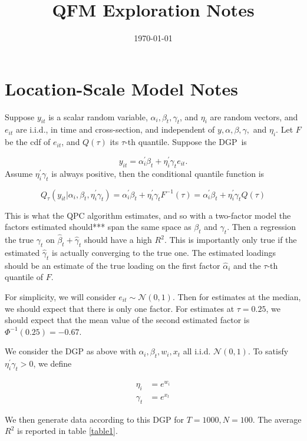 \documentclass{article}
\title{QFM Exploration Notes}
\author{}
\date{\today}
\begin{document}
\maketitle

\section{Location-Scale Model Notes}

Suppose $y_{it}$ is a scalar random variable, $\alpha_{i}, \beta_t, \gamma_t$, and $\eta_i$ are random vectors, and $e_{it}$ are i.i.d., in time and cross-section, and independent of $y, \alpha, \beta, \gamma,$ and $\eta_i$. Let $F$ be the cdf of $e_{it}$, and $Q(\tau )$ its $\tau $-th quantile. Suppose the DGP\ is

%
\begin{equation*}
	y_{it}= \alpha_i^{\prime }\beta_t +\eta_i^{\prime}\gamma_te_{it}.
\end{equation*}
%
Assume $\eta_i^{\prime}\gamma_t$ is always positive, then the conditional quantile function is

%
\begin{equation*}
	Q_{\tau }(y_{it}|\alpha_i, \beta_t, \eta_i ^{\prime}\gamma_t)=\alpha_i^{\prime}\beta_t + \eta_i^{\prime}\gamma_t F^{-1}(\tau)= \alpha_i^{\prime}\beta_t + \eta_i^{\prime}\gamma_t Q(\tau)
\end{equation*}
%

This is what the QPC algorithm estimates, and so with a two-factor model the factors estimated should*** span the same space as $\beta_t$ and $\gamma_t$. Then a regression the true $\gamma_t$ on $\hat{\beta}_t + \hat{\gamma}_t$ should have a high $R^2$. This is importantly only true if the estimated $\hat{\gamma}_t$ is actually converging to the true one. The estimated loadings should be an estimate of the true loading on the first factor $\hat{\alpha}_i$ and the $\tau$-th quantile of $F$. 

For simplicity, we will consider $e_{it} \sim \mathcal{N}(0, 1)$. Then for estimates at the median, we should expect that there is only one factor. For estimates at $\tau = 0.25$, we should expect that the mean value of the second estimated factor is  $\Phi^{-1}(0.25) = -0.67$.

We consider the DGP as above with $\alpha_i, \beta_t, w_i, x_t$ all i.i.d. $\mathcal{N}(0, 1)$. To satisfy $\eta_i^{\prime}\gamma_t > 0$, we define 

\begin{align*} 
	\eta_i  &= e^{w_i} \\
	\gamma_t &= e^{x_t} 
\end{align*}

We then generate data according to this DGP for $T = 1000, N = 100$. The average $R^2$ is reported in table \ref{table1}. 
\end{document}
